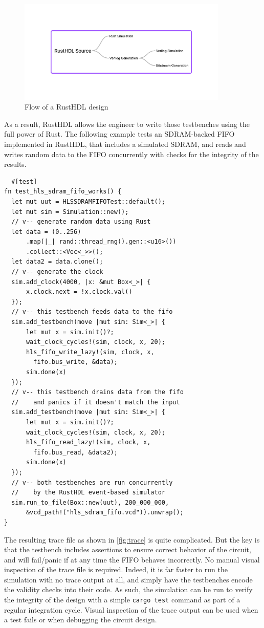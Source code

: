 \documentclass[conference]{IEEEtran}
\begin{document}
\begin{figure}[htbp]
  \centerline{\includegraphics[width=10cm]{flow.png}}
  \caption{Flow of a RustHDL design}
  \label{fig:flow}
\end{figure}


As a result, RustHDL allows the engineer to write those testbenches using 
the full power of Rust.  The following example tests an SDRAM-backed FIFO implemented in RustHDL, that
includes a simulated SDRAM, and reads and writes random data to the FIFO concurrently with checks for
the integrity of the results.

\begin{verbatim}
  #[test]
fn test_hls_sdram_fifo_works() {
  let mut uut = HLSSDRAMFIFOTest::default();
  let mut sim = Simulation::new();
  // v-- generate random data using Rust
  let data = (0..256)
      .map(|_| rand::thread_rng().gen::<u16>())
      .collect::<Vec<_>>();
  let data2 = data.clone();
  // v-- generate the clock
  sim.add_clock(4000, |x: &mut Box<_>| {
      x.clock.next = !x.clock.val()
  });
  // v-- this testbench feeds data to the fifo
  sim.add_testbench(move |mut sim: Sim<_>| {
      let mut x = sim.init()?;
      wait_clock_cycles!(sim, clock, x, 20);
      hls_fifo_write_lazy!(sim, clock, x, 
        fifo.bus_write, &data);
      sim.done(x)
  });
  // v-- this testbench drains data from the fifo
  //    and panics if it doesn't match the input
  sim.add_testbench(move |mut sim: Sim<_>| {
      let mut x = sim.init()?;
      wait_clock_cycles!(sim, clock, x, 20);
      hls_fifo_read_lazy!(sim, clock, x, 
        fifo.bus_read, &data2);
      sim.done(x)
  });
  // v-- both testbenches are run concurrently
  //    by the RustHDL event-based simulator
  sim.run_to_file(Box::new(uut), 200_000_000, 
      &vcd_path!("hls_sdram_fifo.vcd")).unwrap();
}
\end{verbatim}

The resulting trace file as shown in \ref{fig:trace} is quite complicated.  But the key is that
the testbench includes assertions to ensure correct behavior of the circuit, and will fail/panic 
if at any time the FIFO behaves incorrectly.  No manual visual inspection of the trace file is
required.  Indeed, it is far faster to run the simulation with no trace output at all, and simply 
have the testbenches encode the validity checks into their code. As such, the simulation can be run to 
verify the integrity of the design with a simple \verb|cargo test| command as part of a 
regular integration cycle.  Visual inspection of the trace output can be used when a test fails or
when debugging the circuit design.
\end{document}
